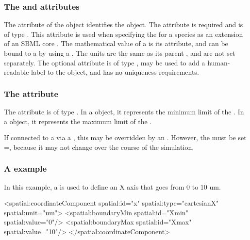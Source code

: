 
\subsubsection{The \fixttspace{} and \fixttspace{} attributes}
The  attribute of the \Boundary object identifies the object.  The attribute is required and is of type . This attribute is used when specifying the \BoundaryCondition for a species as an extension of an SBML core \Parameter.  The mathematical value of a \Boundary is its  attribute, and can be bound to a \Parameter by using a \SpatialSymbolReference.  The units are the same as its parent \CoordinateComponent, and are not set separately.  The optional  attribute is of type , may be used to add a human-readable label to the object, and has no uniqueness requirements.

\subsubsection{The \fixttspace{} attribute}
The  attribute is of type . In a  object, it represents the minimum limit of the \CoordinateComponent.  In a  object, it represents the maximum limit of the \CoordinateComponent.


If connected to a \Parameter via a \SpatialSymbolReference, this  may be overridden by an \InitialAssignment.  However, the \Parameter must be set =, because it may not change over the course of the simulation.


\subsubsection{A \CoordinateComponent example}
In this example, a \CoordinateComponent is used to define an X axis that goes from 0 to 10 um.

\begin{example}
  <spatial:coordinateComponent spatial:id="x" spatial:type="cartesianX" spatial:unit="um">
    <spatial:boundaryMin spatial:id="Xmin" spatial:value="0"/>
    <spatial:boundaryMax spatial:id="Xmax" spatial:value="10"/>
  </spatial:coordinateComponent>
\end{example}


